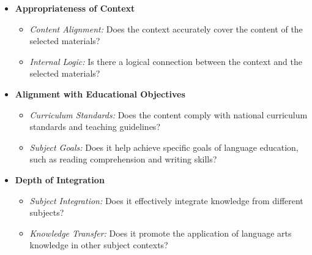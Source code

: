 \begin{itemize}
    \item \textbf{Appropriateness of Context}
    \begin{itemize}
        \item \textit{Content Alignment:} Does the context accurately cover the content of the selected materials?
        \item \textit{Internal Logic:} Is there a logical connection between the context and the selected materials?
    \end{itemize}
    \item \textbf{Alignment with Educational Objectives}
    \begin{itemize}
        \item \textit{Curriculum Standards:} Does the content comply with national curriculum standards and teaching guidelines?
        \item \textit{Subject Goals:} Does it help achieve specific goals of language education, such as reading comprehension and writing skills?
    \end{itemize}
    \item \textbf{Depth of Integration}
    \begin{itemize}
        \item \textit{Subject Integration:} Does it effectively integrate knowledge from different subjects?
        \item \textit{Knowledge Transfer:} Does it promote the application of language arts knowledge in other subject contexts?
    \end{itemize}
\end{itemize}




